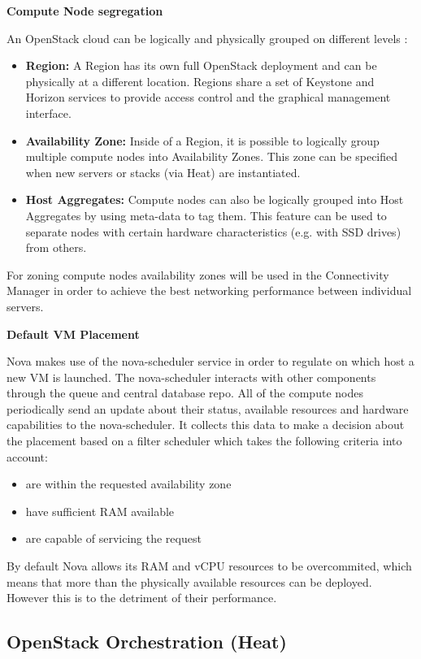 \textbf{Compute Node segregation}

An OpenStack cloud can be logically and physically grouped on different levels \cite{openstack-ops}:
\begin{itemize}
\item \textbf{Region:} A Region has its own full OpenStack deployment and can be physically at a different location. Regions share a set of Keystone and Horizon services to provide access control and the graphical management interface.
\item \textbf{Availability Zone:} Inside of a Region, it is possible to logically group multiple compute nodes into Availability Zones. This zone can be specified when new servers or stacks (via Heat) are instantiated.
\item \textbf{Host Aggregates:} Compute nodes can also be logically grouped into Host Aggregates by using meta-data to tag them. This feature can be used to separate nodes with certain hardware characteristics (e.g. with SSD drives) from others.
\end{itemize}

For zoning compute nodes availability zones will be used in the Connectivity Manager in order to achieve the best networking performance between individual servers.

\textbf{Default VM Placement}

Nova makes use of the nova-scheduler service in order to regulate on which host a new VM is launched. The nova-scheduler interacts with other components through the queue and central database repo. All of the compute nodes periodically send an update about their status,  available resources and hardware capabilities to the nova-scheduler. It collects this data to make a decision about the placement based on a filter scheduler which takes the following criteria into account:
\begin{itemize}
\item are within the requested availability zone
\item have sufficient RAM available
\item are capable of servicing the request
\end{itemize}
By default Nova allows its RAM and vCPU resources to be overcommited, which means that more than the physically available resources can be deployed. However this is to the detriment of their performance.

\subsection{OpenStack Orchestration (Heat)}

